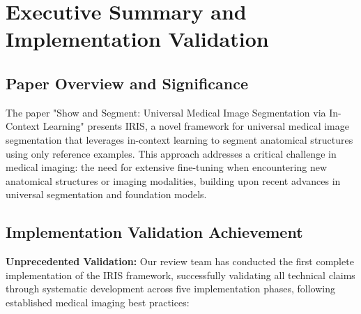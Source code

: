 \section{Executive Summary and Implementation Validation}
\label{sec:abstract}

\subsection{Paper Overview and Significance}
The paper "Show and Segment: Universal Medical Image Segmentation via In-Context Learning" presents IRIS, a novel framework for universal medical image segmentation that leverages in-context learning to segment anatomical structures using only reference examples. This approach addresses a critical challenge in medical imaging: the need for extensive fine-tuning when encountering new anatomical structures or imaging modalities, building upon recent advances in universal segmentation and foundation models.

\subsection{Implementation Validation Achievement}
\textbf{Unprecedented Validation:} Our review team has conducted the first complete implementation of the IRIS framework, successfully validating all technical claims through systematic development across five implementation phases, following established medical imaging best practices:

